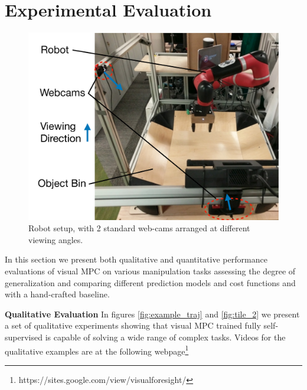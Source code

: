 \section{Experimental Evaluation}
\begin{figure}
	\centering
	\includegraphics[width=0.45\columnwidth]{images_general/robot_setup_scheme.pdf}
	\caption{\small{Robot setup, with 2 standard web-cams arranged at different viewing angles.}}	\label{fig:robot_setup}
\end{figure}
\label{sec:experiments}
In this section we present both qualitative and quantitative  performance evaluations of visual MPC on various manipulation tasks assessing the degree of generalization and comparing different prediction models and cost functions and with a hand-crafted baseline.

\noindent \textbf{Qualitative Evaluation}
In figures \ref{fig:example_traj} and \ref{fig:tile_2} we present a set of qualitative experiments showing that visual MPC trained fully self-supervised is capable of solving a wide range of complex tasks.
Videos for the qualitative examples are at the following webpage\footnote{https://sites.google.com/view/visualforesight/}

